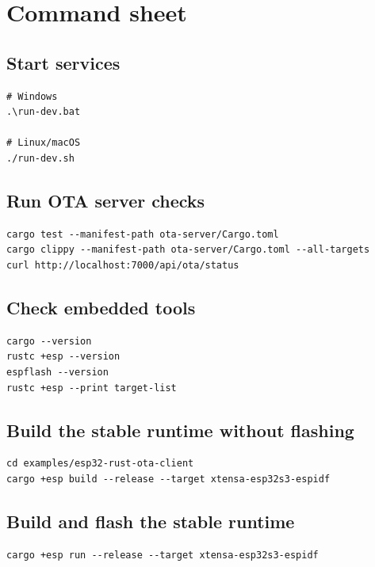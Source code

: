 \section{Command sheet}

\subsection{Start services}

\begin{lstlisting}[numbers=none]
# Windows
.\run-dev.bat

# Linux/macOS
./run-dev.sh
\end{lstlisting}

\subsection{Run OTA server checks}

\begin{lstlisting}[numbers=none]
cargo test --manifest-path ota-server/Cargo.toml
cargo clippy --manifest-path ota-server/Cargo.toml --all-targets
curl http://localhost:7000/api/ota/status
\end{lstlisting}

\subsection{Check embedded tools}

\begin{lstlisting}[numbers=none]
cargo --version
rustc +esp --version
espflash --version
rustc +esp --print target-list
\end{lstlisting}

\subsection{Build the stable runtime without flashing}

\begin{lstlisting}[numbers=none]
cd examples/esp32-rust-ota-client
cargo +esp build --release --target xtensa-esp32s3-espidf
\end{lstlisting}

\subsection{Build and flash the stable runtime}

\begin{lstlisting}[numbers=none]
cargo +esp run --release --target xtensa-esp32s3-espidf
\end{lstlisting}

